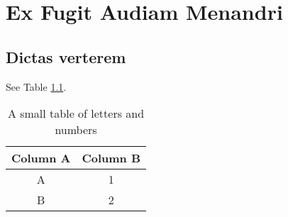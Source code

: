 \chapter{Ex Fugit Audiam Menandri}

\lipsum[6]

\section{Dictas verterem}

\lipsum[7-9] See Table \ref{tab:a}.

\begin{table}[!htbp]
    \centering
    \caption{A small table of letters and numbers}
    \begin{tabular}{cc}
        \toprule
        Column A & Column B \\
        \midrule
        A & 1\\
        B & 2\\
        \bottomrule
    \end{tabular}
    \label{tab:a}
\end{table}